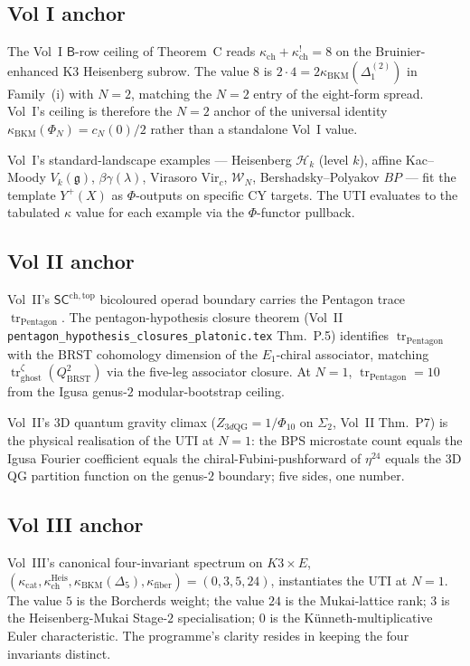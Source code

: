\documentclass[11pt]{article}
\theoremstyle{definition}
\newcommand{\kch}{\kappa_{\mathrm{ch}}}
\newcommand{\kcat}{\kappa_{\mathrm{cat}}}
\newcommand{\kBKM}{\kappa_{\mathrm{BKM}}}
\newcommand{\kfiber}{\kappa_{\mathrm{fiber}}}
\newcommand{\BRST}{\mathrm{BRST}}
\newcommand{\tr}{\operatorname{tr}}
\begin{document}
\subsection{Vol I anchor}

The Vol~I $\mathsf{B}$-row ceiling of Theorem~C reads
$\kappa_{\mathrm{ch}} + \kappa_{\mathrm{ch}}^! = 8$ on the
Bruinier-enhanced K3 Heisenberg subrow. The value $8$ is
$2 \cdot 4 = 2 \kBKM(\Delta_1^{(2)})$ in Family~(i) with $N = 2$,
matching the $N = 2$ entry of the eight-form spread. Vol~I's
ceiling is therefore the $N = 2$ anchor of the universal identity
$\kBKM(\Phi_N) = c_N(0)/2$ rather than a standalone Vol~I value.

Vol~I's standard-landscape examples --- Heisenberg $\mathcal{H}_k$
(level $k$), affine Kac--Moody $V_k(\mathfrak{g})$, $\beta\gamma(\lambda)$,
Virasoro $\mathrm{Vir}_c$, $\mathcal{W}_N$, Bershadsky--Polyakov $BP$ ---
fit the template $Y^+(X)$ as $\Phi$-outputs on specific CY targets. The
UTI evaluates to the tabulated $\kappa$ value for each example via the
$\Phi$-functor pullback.

\subsection{Vol II anchor}

Vol~II's $\mathsf{SC}^{\mathrm{ch,top}}$ bicoloured operad boundary
carries the Pentagon trace $\tr_{\mathrm{Pentagon}}$. The pentagon-hypothesis
closure theorem (Vol~II \texttt{pentagon\_hypothesis\_closures\_platonic.tex}
Thm.~P.5) identifies $\tr_{\mathrm{Pentagon}}$ with the BRST cohomology
dimension of the $E_1$-chiral associator, matching
$\tr^{\zeta}_{\mathrm{ghost}}(Q_{\BRST}^2)$ via the five-leg associator
closure. At $N = 1$, $\tr_{\mathrm{Pentagon}} = 10$ from the Igusa
genus-$2$ modular-bootstrap ceiling.

Vol~II's 3D quantum gravity climax ($Z_{3d\mathrm{QG}} = 1/\Phi_{10}$ on
$\Sigma_2$, Vol~II Thm.~P7) is the physical realisation of the UTI at
$N = 1$: the BPS microstate count equals the Igusa Fourier coefficient
equals the chiral-Fubini-pushforward of $\eta^{24}$ equals the 3D QG
partition function on the genus-$2$ boundary; five sides, one number.

\subsection{Vol III anchor}

Vol~III's canonical four-invariant spectrum on $K3 \times E$,
$(\kcat, \kch^{\mathrm{Heis}}, \kBKM(\Delta_5), \kfiber) = (0, 3, 5, 24)$,
instantiates the UTI at $N = 1$. The value $5$ is the Borcherds weight;
the value $24$ is the Mukai-lattice rank; $3$ is the Heisenberg-Mukai
Stage-$2$ specialisation; $0$ is the K\"unneth-multiplicative Euler
characteristic. The programme's clarity resides in keeping the four
invariants distinct.
\end{document}

